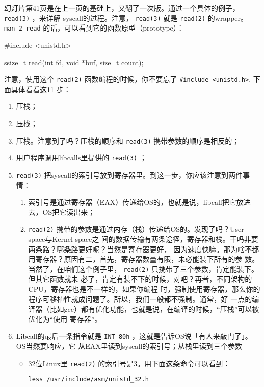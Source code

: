 \documentclass{wx672ctexart}
\newcommand\mpic[1]{%
  \marginpar{\texttt{[image: thumbnails/\#1]}}}
\begin{document}
\mpic{pg_0041}幻灯片第41页是在上一页的基础上，又翻了一次版。通过一个具体的例子， \texttt{read(3)} ，来详解
syscall的过程。注意， \texttt{read(3)} 就是 \texttt{read(2)} 的wrapper。 \texttt{man 2 read}
的话，可以看到它的函数原型（prototype）：
\begin{ccode}
#include <unistd.h>

ssize_t read(int fd, void *buf, size_t count);
\end{ccode}
注意，使用这个 \texttt{read(2)} 函数编程的时候，你不要忘了 \texttt{\#include <unistd.h>}. 下面具体看看这11
步：
\begin{enumerate}
\item 压栈；
\item 压栈；
\item 压栈。注意到了吗？压栈的顺序和 \texttt{read(3)} 携带参数的顺序是相反的；
\item 用户程序调用libcalls里提供的 \texttt{read(3)} ；
\item \texttt{read(3)} 把syscall的索引号放到寄存器里。到这一步，你应该注意到两件事情：
\begin{enumerate}
\item 索引号是通过寄存器（EAX）传递给OS的，也就是说，libcall把它放进去，OS把它读出来；
\item \texttt{read(2)} 携带的参数是通过内存（栈）传递给OS的。发现了吗？User space与Kernel space之
间的数据传输有两条途径，寄存器和栈。干吗非要两条路？哪条路更好呢？当然是寄存器更好，
因为速度快嘛。那为啥不都用寄存器？原因有二，首先，寄存器数量有限，未必能装下所有的参
数。当然了，在咱们这个例子里， \texttt{read(2)} 只携带了三个参数，肯定能装下。但其它函数就未
必了，肯定有装不下的时候，对吧？再者，不同架构的CPU，寄存器也是不一样的，如果你编程
时，强制使用寄存器，那么你的程序可移植性就成问题了。所以，我们一般都不强制。通常，好
一点的编译器（比如gcc）都有优化功能，也就是说，在编译的时候，“压栈”可以被优化为“使用
寄存器”。
\end{enumerate}
\item Libcall的最后一条指令就是 \texttt{INT 80h} ，这就是告诉OS说「有人来敲门了」。OS当然要响应，它
从EAX里读到syscall的索引号；从栈里读到三个参数
\begin{itemize}
\item 32位Linux里 \texttt{read(2)} 的索引号是3。用下面这条命令可以看到：
\begin{verbatim}
less /usr/include/asm/unistd_32.h
\end{verbatim}


\end{itemize}
\end{enumerate}
\end{document}
